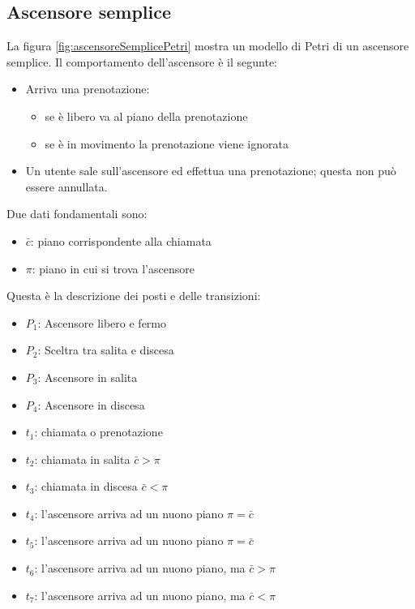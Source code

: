 \documentclass[a4paper]{report}
\begin{document}
\subsection{Ascensore semplice}

La figura \ref{fig:ascensoreSemplicePetri} mostra un modello di Petri
di un ascensore semplice. Il comportamento
dell'ascensore \`e il segunte:
\begin{itemize}
\item Arriva una prenotazione:
  \begin{itemize}
  \item se \`e libero va al piano della prenotazione
  \item se \`e in movimento la prenotazione viene ignorata
  \end{itemize}
\item Un utente sale sull'ascensore ed effettua una prenotazione;
  questa non pu\`o essere annullata.
\end{itemize}
Due dati fondamentali sono:
\begin{itemize}
\item $\bar{c}$: piano corrispondente alla chiamata
\item $\pi$: piano in cui si trova l'ascensore
\end{itemize}
Questa \`e la descrizione dei posti e delle transizioni:
\begin{itemize}
\item $P_1$: Ascensore libero e fermo
\item $P_2$: Sceltra tra salita e discesa
\item $P_3$: Ascensore in salita
\item $P_4$: Ascensore in discesa
\item $t_1$: chiamata o prenotazione
\item $t_2$: chiamata in salita $\bar{c} > \pi$
\item $t_3$: chiamata in discesa $\bar{c} < \pi$
\item $t_4$: l'ascensore arriva ad un nuono piano $\pi = \bar{c}$
\item $t_5$: l'ascensore arriva ad un nuono piano $\pi = \bar{c}$
\item $t_6$: l'ascensore arriva ad un nuono piano, ma $\bar{c} > \pi$
\item $t_7$: l'ascensore arriva ad un nuono piano, ma $\bar{c} < \pi$
\end{itemize}
\end{document}
